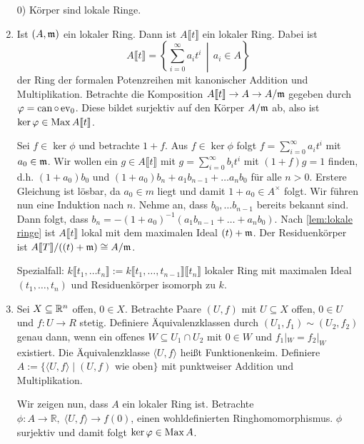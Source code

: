 \documentclass[12pt,a4paper]{scrartcl}
\theoremstyle{cplain}
\theoremstyle{cdef}
\begin{document}
\begin{bsp}
	\begin{enumerate}
        \leavevmode
		\item[0)] Körper sind lokale Ringe.
        \item Ist $(A,\mathfrak{m})$ ein lokaler Ring. Dann ist $A\llbracket t \rrbracket$ ein lokaler Ring. Dabei ist \[ A\llbracket t \rrbracket=\left\{\sum_{i=0}^\infty a_it^i \,\middle|\, a_i \in A\right\} \] der Ring der formalen Potenzreihen mit kanonischer Addition und Multiplikation. Betrachte die Komposition $A\llbracket t \rrbracket \to A \to A/\mathfrak{m}$ gegeben durch $\varphi=\operatorname{can} \circ \operatorname{ev}_0$. Diese bildet surjektiv auf den Körper $A/\mathfrak{m}$ ab, also ist $\operatorname{ker} \varphi \in \operatorname{Max} A\llbracket t \rrbracket$.
        
        Sei $f \in \ker \phi$ und betrachte $1+ f$. Aus $f \in \ker \phi$ folgt $f=\sum_{i=0}^\infty a_it^i$ mit $a_0 \in \mathfrak{m}$. Wir wollen ein $g \in A\llbracket t\rrbracket$ mit $g=\sum_{i=0}^\infty b_it^i$ mit $(1+f)g=1$ finden, d.h. $(1+a_0)b_0$ und $(1+a_0)b_n+a_1b_{n-1}+\dots a_nb_0$ für alle $n > 0$. Erstere Gleichung ist lösbar, da $a_0 \in m$ liegt und damit $1+a_0 \in A^{\times}$ folgt. Wir führen nun eine Induktion nach $n$. Nehme an, dass $b_0, \dots b_{n-1}$ bereits bekannt sind. Dann folgt, dass $b_n=-(1+a_0)^{-1}(a_1b_{n-1}+\dots+a_nb_0)$. Nach \cref{lem:lokale ringe} ist $A\llbracket t \rrbracket$ lokal mit dem maximalen Ideal $(t)+\mathfrak{m}$. Der Residuenkörper ist $A\llbracket T\rrbracket /((t)+\mathfrak{m}) \cong A/\mathfrak{m}$.

        Spezialfall: $k\llbracket t_1,\dots t_n\rrbracket := k\llbracket t_1,\dots,t_{n-1}\rrbracket\llbracket t_n\rrbracket$ lokaler Ring mit maximalen Ideal $(t_1,\dots,t_n)$ und Residuenkörper isomorph zu $k$.
        
		\item Sei $X \subseteq \mathbb R^n$ offen, $0 \in X$. Betrachte Paare $(U,f)$ mit $U \subseteq X$ offen, $0 \in U$ und $f:U \to R$ stetig. Definiere Äquivalenzklassen durch $(U_1,f_1) \sim (U_2,f_2)$ genau dann, wenn ein offenes $W \subseteq U_1 \cap U_2$ mit $0 \in W$ und $f_1|_W=f_2|_W$ existiert. Die Äquivalenzklasse $\langle U,f \rangle$ heißt Funktionenkeim. Definiere $A := \{\langle U,f \rangle \mid (U,f) \text{ wie oben}\}$ mit  punktweiser Addition und Multiplikation.

		Wir zeigen nun, dass $A$ ein lokaler Ring ist. Betrachte $\phi: A \to \mathbb{R}, \; \langle U,f \rangle \to f(0)$, einen wohldefinierten Ringhomomorphismus. $\phi$ surjektiv und damit folgt $\operatorname{ker} \varphi \in \operatorname{Max} A$.


\end{enumerate}
\end{bsp}
\end{document}
